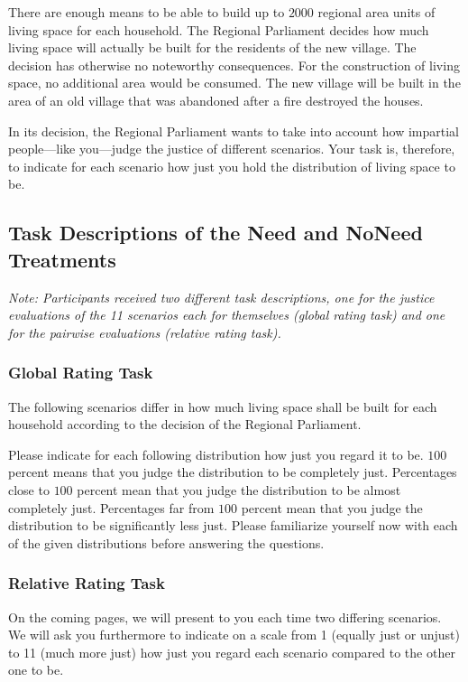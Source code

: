 \documentclass[12pt]{scrartcl}
\begin{document}
There are enough means to be able to build up to $2000$ regional area units of living space for each household.
The Regional Parliament decides how much living space will actually be built for the residents of the new village.
The decision has otherwise no noteworthy consequences.
For the construction of living space, no additional area would be consumed.
The new village will be built in the area of an old village that was abandoned after a fire destroyed the houses.

In its decision, the Regional Parliament wants to take into account how impartial people---like you---judge the justice of different scenarios.
Your task is, therefore, to indicate for each scenario how just you hold the distribution of living space to be.

\subsection*{Task Descriptions of the Need and NoNeed Treatments}
\textit{Note: Participants received two different task descriptions, one for the justice evaluations of the 11 scenarios each for themselves (global rating task) and one for the pairwise evaluations (relative rating task).}

\subsubsection*{Global Rating Task}
The following scenarios differ in how much living space shall be built for each household according to the decision of the Regional Parliament.

Please indicate for each following distribution how just you regard it to be.
$100$ percent means that you judge the distribution to be completely just.
Percentages close to $100$ percent mean that you judge the distribution to be almost completely just.
Percentages far from $100$ percent mean that you judge the distribution to be significantly
less just.
Please familiarize yourself now with each of the given distributions before answering the questions.

\subsubsection*{Relative Rating Task}
On the coming pages, we will present to you each time two differing scenarios. We will ask you furthermore to indicate on a scale from 1 (equally just or unjust) to 11 (much more just) how just you regard each scenario compared to the other one to be.
\end{document}
